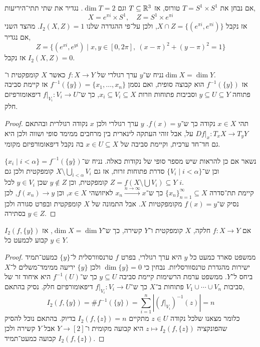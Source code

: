 \begin{example}
	אם נבחן את $T = S^1 \times S^1$ טורוס, אז $T \subseteq \mathbb{R}^3$ וגם $\dim T = 2$.
	נגדיר את שתי תתי־היריעות,
	\[
		X = e^{\pi i} \times S^1,
		\quad
		Z = S^1 \times e^{\pi i}
	\]
	אז נקבל $X \cap Z = \{ (e^{\pi i}, e^{\pi i}) \}$, ולכן על־פי ההגדרה שלנו $I_2(X, Z) = 1$.
	מהצד השני אם נגדיר,
	\[
		Z = \{ (e^{x i}, e^{y i}) \mid x, y \in [0, 2 \pi],\ {(x - \pi)}^2 + {(y - \pi)}^2 = 1 \}
	\]
	אז נקבל $I_2(X, Z) = 0$.
\end{example}
\begin{theorem}
	נניח ש־$y$ ערך רגולרי של $f : X \to Y$ כאשר $X$ קומפקטית ו־$\dim X = \dim Y$. \\
	אז $f^{-1}(\{ y \})$ הוא קבוצה סופית, ואם נסמן $f^{-1}(\{ y \}) = \{ x_1, \ldots, x_n \}$ אז קיימת סביבה פתוחה $y \subseteq U \subseteq Y$ וסביבות פתוחות וזרות $x_i \subseteq V_i \subseteq X$,
	כך ש־$f|_{V_i} : V_i \to U$ דיפאומורפיזם חלק.
\end{theorem}
\begin{proof}
	תהי $x \in X$ נקודה כך ש־$f(x) = y$.
	$y$ ערך רגולרי ולכן $x$ נקודה רגולרית ובהתאם $Df|_x : T_x X \to T_y Y$ על, אבל זוהי העתקה לינארית בין מרחבים ממימד סופי ושווה ולכן היא גם חד־חד ערכית, וקיימת סביבה של $x \in U \subseteq X$ בה נקבל דיפאומורפיזם מקומי.

	נשאר אם כן להראות שיש מספר סופי של נקודות כאלה.
	נניח ש־$\{ x_i \mid i < \alpha \} = f^{-1}(\{ y \})$ וכן ש־$\{ V_i \mid i < \alpha \}$ סדרת פתוחות זרות,
	אז גם $X \setminus \bigcup_{i < \alpha} V_i$ קומפקטית ולכן גם $Z = f(X \setminus \bigcup V_i) \subseteq Y$ קומפקטית, וכן $y \notin Z$ שכן $y \in V_i$ לכל $i$. \\
	קיימת תת־סדרה ${\{ x_n \}}_{n = 1}^\infty \subseteq X$ כך ש־$x_n \xrightarrow{n \to \infty} x$ לאיזושהי $x \in X$, וכן $f(x_n) \to y$, לכן נסיק ש־$f(x) = y$ מקומפקטיות $X$.
	אבל התמונה של $X$ קומפקטית ובפרט סגורה ולכן $y \in Z$ בסתירה.
\end{proof}
\begin{theorem}
	אם $f : X \to Y$ חלקה, $X$ קומפקטית ו־$Y$ קשירה, כך ש־$\dim X = \dim Y$,
	אז $I_2(f, \{ y \})$ קבוע לכמעט כל $y \in Y$.
\end{theorem}
\begin{proof}
	ממשפט סארד כמעט כל $y$ היא ערך רגולרי, בפרט $f$ טרנסוורסלית ל־$\{ y \}$ כמעט־תמיד ישירות מהגדרת טרנסוורסליות.
	נבחין כי $\dim \{ y \} = 0$ ולכן $\{ y \}$ יריעה ממימד־משלים ל־$X$ ביחס ל־$Y$.
	ממשפט ערמת הרשימות קיימת סביבה $y \subseteq U$ כך ש־$f^{-1}(U)$ היא איחוד זר של סביבות $V_1 \cup \cdots \cup V_n$ פתוחות ב־$X$ כך ש־$f |_{V_i} : V_i \to U$ דיפאומורפיזם חלק.
	נסיק בהתאם,
	\[
		I_2(f, \{ y \}) = \# f^{-1}(\{ y \}) = \sum_{i = 1}^n |{(f |_{V_i})}^{-1}(z)| = n
	\]
	כלומר מצאנו שלכל נקודה $z \in U$ מתקיים $I_2(f, \{ z \}) = n$ בדיוק.
	בהתאם נוכל להסיק שהפונקציה $z \mapsto I_2(f, \{ z \})$ היא קבועה מקומית ו־$Y \to [2]$ אבל $Y$ קשירה ולכן $I_2(f, \{ z \})$ קבועה כמעט־תמיד.
\end{proof}
